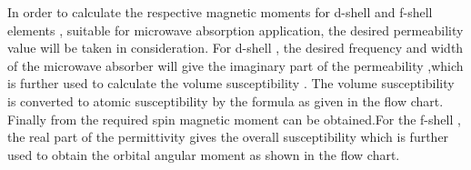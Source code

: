 \documentclass[journal]{IEEEtran}
\begin{document}
In order to calculate the respective magnetic moments for d-shell and f-shell elements , suitable for microwave absorption application, the desired  permeability value will be taken in consideration. For d-shell , the desired frequency and width of the microwave absorber will give the imaginary part of the permeability ,which is further used to calculate the volume susceptibility . The volume susceptibility is converted to atomic susceptibility by the formula as given in the flow chart. Finally from   the required spin magnetic moment can be obtained.For the f-shell , the real part of the permittivity gives the overall susceptibility which is further used to obtain the orbital angular moment as shown in the flow chart.
\label{2}
\end{document}
